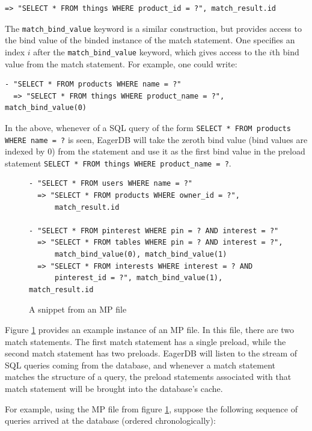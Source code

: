 \documentclass[12pt]{article}
\begin{document}
\begin{lstlisting}
=> "SELECT * FROM things WHERE product_id = ?", match_result.id
\end{lstlisting}

The \texttt{match\_bind\_value} keyword is a similar construction, but provides access to the bind value of the binded instance of the match statement. One specifies an index $i$ after the \texttt{match\_bind\_value} keyword, which gives access to the $i$th bind value from the match statement. For example, one could write:

\begin{lstlisting}
- "SELECT * FROM products WHERE name = ?"
  => "SELECT * FROM things WHERE product_name = ?", match_bind_value(0)
\end{lstlisting}

In the above, whenever of a SQL query of the form \texttt{SELECT * FROM products WHERE name = ?} is seen, EagerDB will take the zeroth bind value (bind values are indexed by 0) from the statement and use it as the first bind value in the preload statement \texttt{SELECT * FROM things WHERE product\_name = ?}.

\begin{figure}[h]
\begin{lstlisting}[frame=single]
- "SELECT * FROM users WHERE name = ?"
  => "SELECT * FROM products WHERE owner_id = ?",
      match_result.id

- "SELECT * FROM pinterest WHERE pin = ? AND interest = ?"
  => "SELECT * FROM tables WHERE pin = ? AND interest = ?",
      match_bind_value(0), match_bind_value(1)
  => "SELECT * FROM interests WHERE interest = ? AND
      pinterest_id = ?", match_bind_value(1), match_result.id
\end{lstlisting}
  \caption{\label{fig:mp-file-example}A snippet from an MP file}
\end{figure}

Figure \ref{fig:mp-file-example} provides an example instance of an MP file. In this file, there are two match statements. The first match statement has a single preload, while the second match statement has two preloads. EagerDB will listen to the stream of SQL queries coming from the database, and whenever a match statement matches the structure of a query, the preload statements associated with that match statement will be brought into the database's cache.

For example, using the MP file from figure \ref{fig:mp-file-example}, suppose the following sequence of queries arrived at the database (ordered chronologically):
\end{document}
